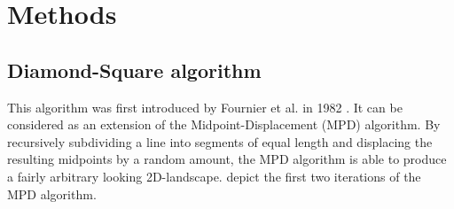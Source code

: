 \documentclass[11pt,a4paper,twoside,openright]{report}
\begin{document}
\chapter{Methods}
\label{sec:methods}

\section{Diamond-Square algorithm}
This algorithm was first introduced by Fournier et al. in 1982 \cite{Fournier:1982:CRS:358523.358553}. It can be considered as an extension of the Midpoint-Displacement (MPD) algorithm. By recursively subdividing a line into segments of equal length and displacing the resulting midpoints by a random amount, the MPD algorithm is able to produce a fairly arbitrary looking 2D-landscape.  depict the first two iterations of the MPD algorithm.
\end{document}
